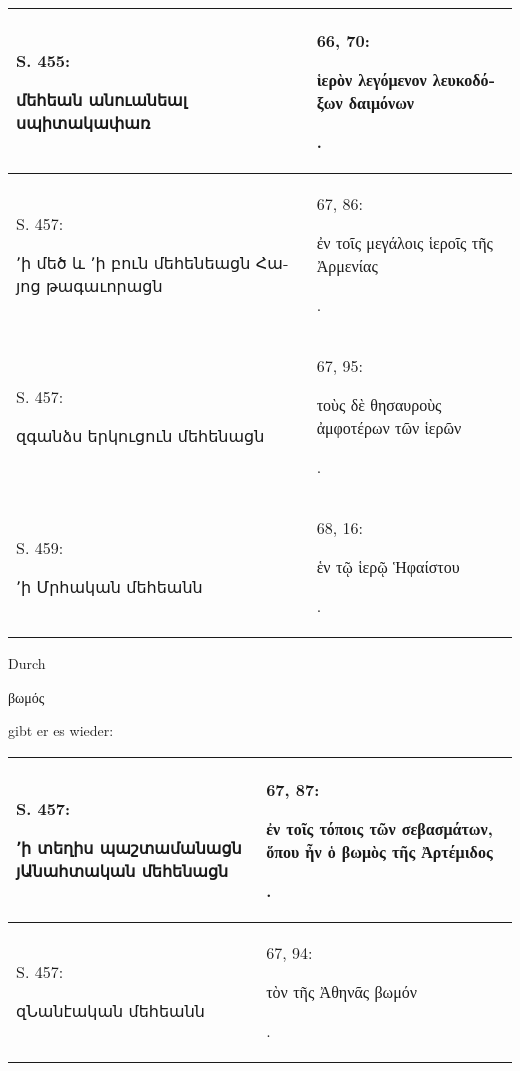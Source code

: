 \documentclass{article}
\begin{document}
{\begin{table}[H]
\begin{tabular}{p{45mm}|p{45mm}}
        S. 455: \begin{armenian}մեհեան անուանեալ սպիտակափառ\end{armenian} & 66, 70: \begin{greek}ἱερὸν λεγόμενον λευκοδόξων δαιμόνων\end{greek}.   \\ \hline
        S. 457: \begin{armenian}՚ի մեծ և ՚ի բուն մեհենեացն Հայոց թագաւորացն\end{armenian} & 67, 86: \begin{greek}ἐν τοῖς μεγάλοις ἱεροῖς τῆς Ἀρμενίας\end{greek}.   \\ \hline
        S. 457: \begin{armenian}զգանձս երկուցուն մեհենացն\end{armenian} & 67, 95: \begin{greek}τοὺς δὲ θησαυροὺς ἀμφοτέρων τῶν ἱερῶν\end{greek}.   \\ \hline
        S. 459: \begin{armenian}՚ի Մրհական մեհեանն\end{armenian} & 68, 16: \begin{greek}ἑν τῷ ἱερῷ Ἡφαίστου\end{greek}. \\ \hline
    \end{tabular}
\end{table}
\hspace*{5mm}Durch \begin{greek}βωμός\end{greek} gibt er es wieder:  
\begin{table}[H]
    \centering
    \color{armeniaRed}
    \footnotesize
    \bfseries
    \begin{tabular}{p{45mm}|p{45mm}}
    \hline
        S. 457: \begin{armenian}՚ի տեղիս պաշտամանացն յԱնահտական մեհենացն\end{armenian} & 67, 87: \begin{greek}ἐν τοῖς τόποις τῶν σεβασμάτων, ὅπου ἦν ὁ βωμὸς τῆς Ἀρτέμιδος\end{greek}.   \\ \hline
        S. 457: \begin{armenian}զՆանէական մեհեանն\end{armenian} & 67, 94: \begin{greek}τὸν τῆς Ἀθηνᾶς βωμόν\end{greek}.   \\ \hline

\end{tabular}
\end{table}}
\end{document}
